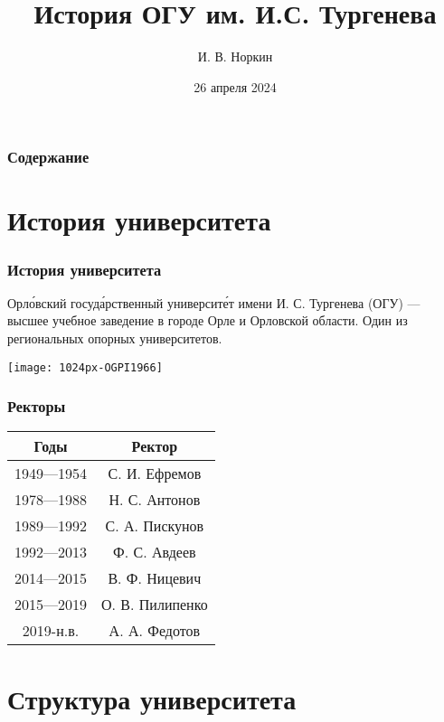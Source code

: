 \documentclass{beamer}
\title{История ОГУ им. И.С. Тургенева}
\author{И. В. Норкин}
\institute{ОГУ им. И.С. Тургенева}
\date{26 апреля 2024}
\begin{document}
\frame{\titlepage}

\begin{frame}

\frametitle{Содержание}
\tableofcontents

\end{frame}
\section{История университета}
\begin{frame}\frametitle{История университета}
\alert{Орло́вский госуда́рственный университе́т имени И. С. Тургенева (ОГУ)} — высшее учебное заведение в городе Орле и Орловской области. Один из региональных опорных университетов.
\begin{center}
\texttt{[image: 1024px-OGPI1966]}
\end{center}
\end{frame}
\begin{frame}
\begin{center}
\frametitle{Ректоры}
\begin{tabular}{ |c|     c     | } 
 \hline
 Годы  & Ректор \\ 
 \hline
 1949—1954 & С. И. Ефремов \\
 \hline
 1978—1988 & Н. С. Антонов \\
 \hline
 1989—1992 & С. А. Пискунов \\
 \hline
 1992—2013 & Ф. С. Авдеев \\
 \hline
 2014—2015 & В. Ф. Ницевич \\
 \hline
 2015—2019 & О. В. Пилипенко \\
 \hline
 2019-н.в. & А. А. Федотов \\
 \hline
\end{tabular}
\end{center}
\section{Структура университета}

\end{frame}
\end{document}
